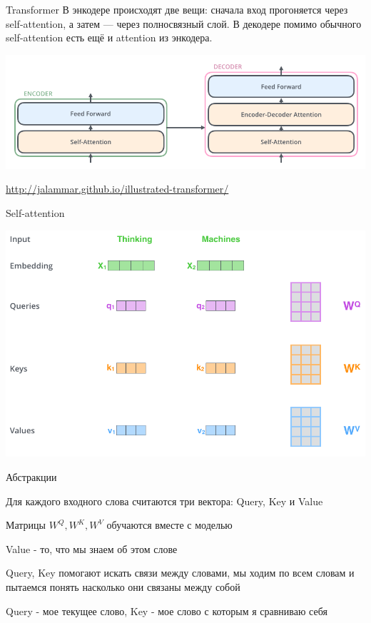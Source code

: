 \documentclass[notes,12pt, aspectratio=169]{beamer}
\newenvironment{wideitemize}{\itemize\addtolength{\itemsep}{10pt}}{\enditemize}
\begin{document}
\begin{frame}{Transformer} 
	В энкодере происходят две вещи: сначала вход прогоняется через self-attention, а затем —
	через полносвязный слой. В декодере помимо обычного self-attention есть ещё и attention
	из энкодера.
	
	\begin{center}
		\includegraphics[width=.8\linewidth]{tranformer03.png}
	\end{center}
	\vfill
	\footnotesize
	{\color{blue} \url{http://jalammar.github.io/illustrated-transformer/}}
\end{frame}


\begin{frame}{Self-attention} 
	\begin{center}
		\includegraphics[width=.7\linewidth]{selfattention.png}
	\end{center}
\end{frame}


\begin{frame}{Абстракции}
	\begin{wideitemize}
		\item  Для каждого входного слова считаются три вектора: Query, Key и Value
		\item  Матрицы $W^Q, W^K , W^V$ обучаются вместе с моделью
		\item  Value - то, что мы знаем об этом слове
		\item  Query, Key помогают искать связи между словами, мы ходим по всем словам и пытаемся понять насколько они связаны между собой 
		\item Query - мое текущее слово, Key - мое слово с которым я сравниваю себя
	\end{wideitemize}
\end{frame}
\end{document}
